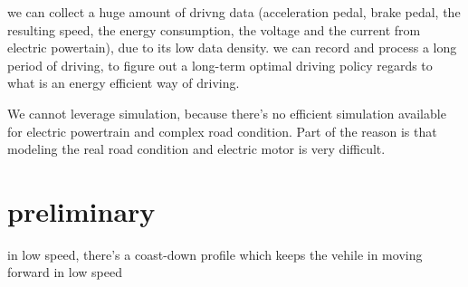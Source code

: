 \documentclass{article}
\begin{document}
we can collect a huge amount of drivng data (acceleration pedal, brake pedal, the resulting speed, the energy consumption, the voltage and the current from electric powertain), due to its low data density. we can record and process a long period of driving, to figure out a long-term optimal driving policy regards to what is an energy efficient way of driving.


We cannot leverage simulation, because there's no efficient simulation available for electric powertrain and complex road condition. Part of the reason is that modeling the real road condition and electric motor is very difficult.

\section{preliminary}

in low speed, there's a coast-down profile which keeps the vehile in moving forward in low speed
\end{document}
